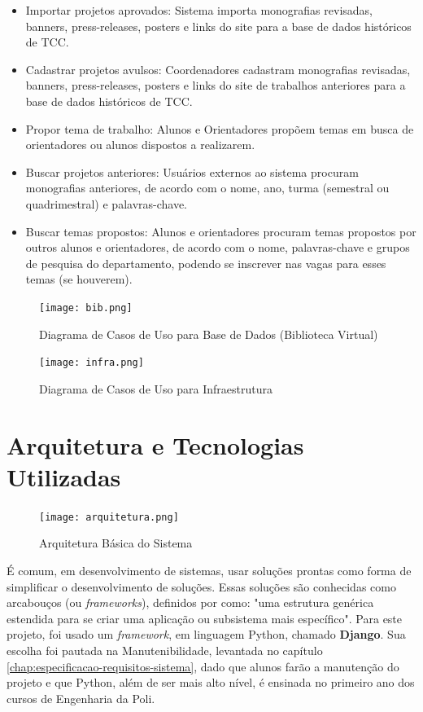 \begin{itemize}
    \item Importar projetos aprovados: Sistema importa monografias revisadas, banners, press-releases, posters e links do site para a base de dados históricos de TCC.
    \item Cadastrar projetos avulsos: Coordenadores cadastram monografias revisadas, banners, press-releases, posters e links do site de trabalhos anteriores para a base de dados históricos de TCC.
    \item Propor tema de trabalho: Alunos e Orientadores propõem temas em busca de orientadores ou alunos dispostos a realizarem.
    \item Buscar projetos anteriores: Usuários externos ao sistema procuram monografias anteriores, de acordo com o nome, ano, turma (semestral ou quadrimestral) e palavras-chave.
    \item Buscar temas propostos: Alunos e orientadores procuram temas propostos por outros alunos e orientadores, de acordo com o nome, palavras-chave e grupos de pesquisa do departamento, podendo se inscrever nas vagas para esses temas (se houverem).
\end{itemize}

\begin{figure}[H]
    \centering
    \texttt{[image: bib.png]}
    \caption{Diagrama de Casos de Uso para Base de Dados (Biblioteca Virtual)}
    \label{fig:use-case-bib}
\end{figure}

\begin{figure}[H]
    \centering
    \texttt{[image: infra.png]}
    \caption{Diagrama de Casos de Uso para Infraestrutura}
    \label{fig:use-case-infra}
\end{figure}

\section{Arquitetura e Tecnologias Utilizadas}

\begin{figure}[H]
    \centering
    \texttt{[image: arquitetura.png]}
    \caption{Arquitetura Básica do Sistema}
    \label{fig:arch}
\end{figure}

É comum, em desenvolvimento de sistemas, usar soluções prontas como forma de simplificar o desenvolvimento de soluções. Essas soluções são conhecidas como arcabouços (ou \textit{frameworks}), definidos por \citeauthor{iansommerville2011} como: "uma estrutura genérica estendida para se criar uma aplicação ou subsistema mais específico". Para este projeto, foi usado um \textit{framework}, em linguagem Python, chamado \textbf{Django}. Sua escolha foi pautada na Manutenibilidade, levantada no capítulo \ref{chap:especificacao-requisitos-sistema}, dado que alunos farão a manutenção do projeto e que Python, além de ser mais alto nível, é ensinada no primeiro ano dos cursos de Engenharia da Poli.

